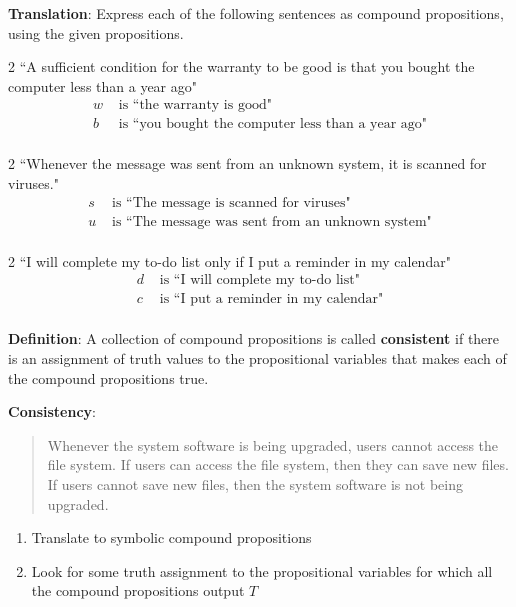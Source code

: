 \documentclass[12pt, oneside]{article}
\begin{document}
{\bf Translation}: Express each of the following sentences as compound propositions, using
the given propositions.

\begin{multicols}{2}
``A sufficient condition for the warranty to be good is that you bought the computer less than a year ago"
\columnbreak
\begin{align*}
w &\text{ is  ``the warranty is good"} \\
b &\text{ is  ``you bought the computer less than a year ago"} \\
\end{align*}
\end{multicols}
\vfill

\begin{multicols}{2}
``Whenever the message was sent from an unknown system, it is scanned for viruses."
\columnbreak
\begin{align*}
s &\text{ is  ``The message is scanned for viruses"} \\
u &\text{ is  ``The message was sent from an unknown system"} \\
\end{align*}
\end{multicols}
\vfill

\begin{multicols}{2}
``I will complete my to-do list only if I put a reminder in my calendar"
\columnbreak
\begin{align*}
d &\text{ is  ``I will complete my to-do list"} \\
c &\text{ is  ``I put a reminder in my calendar"} \\
\end{align*}
\end{multicols}
\vfill \newpage


{\bf Definition}: A collection of  compound  propositions
is called {\bf consistent} if  there
is  an assignment  of  truth values
to  the  propositional variables that makes
each of the compound propositions  true.
 

{\bf Consistency}: 
\begin{quote}
Whenever the system software is being upgraded, users cannot access the file system. 
If users can access the file system, then they can save new files. 
If users cannot save new files, then the system software is not being upgraded.
\end{quote}

\begin{enumerate}
\item Translate to symbolic compound propositions
\vfill
\item Look for some truth assignment to the propositional variables for which all the compound propositions output $T$
\vfill
\end{enumerate} \newpage
\end{document}
